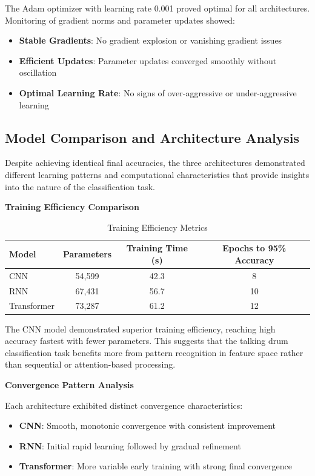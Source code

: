 \documentclass[12pt,a4paper]{article}
\begin{document}
The Adam optimizer with learning rate 0.001 proved optimal for all architectures. Monitoring of gradient norms and parameter updates showed:

\begin{itemize}
\item \textbf{Stable Gradients}: No gradient explosion or vanishing gradient issues
\item \textbf{Efficient Updates}: Parameter updates converged smoothly without oscillation
\item \textbf{Optimal Learning Rate}: No signs of over-aggressive or under-aggressive learning
\end{itemize}

\subsection{Model Comparison and Architecture Analysis}

Despite achieving identical final accuracies, the three architectures demonstrated different learning patterns and computational characteristics that provide insights into the nature of the classification task.

\textbf{Training Efficiency Comparison}

\begin{table}[H]
\centering
\caption{Training Efficiency Metrics}
\label{tab:efficiency_comparison}
\begin{tabular}{@{}lccc@{}}
\toprule
\textbf{Model} & \textbf{Parameters} & \textbf{Training Time (s)} & \textbf{Epochs to 95\% Accuracy} \\
\midrule
CNN & 54,599 & 42.3 & 8 \\
RNN & 67,431 & 56.7 & 10 \\
Transformer & 73,287 & 61.2 & 12 \\
\bottomrule
\end{tabular}
\end{table}

The CNN model demonstrated superior training efficiency, reaching high accuracy fastest with fewer parameters. This suggests that the talking drum classification task benefits more from pattern recognition in feature space rather than sequential or attention-based processing.

\textbf{Convergence Pattern Analysis}

Each architecture exhibited distinct convergence characteristics:

\begin{itemize}
\item \textbf{CNN}: Smooth, monotonic convergence with consistent improvement
\item \textbf{RNN}: Initial rapid learning followed by gradual refinement
\item \textbf{Transformer}: More variable early training with strong final convergence
\end{itemize}
\end{document}
